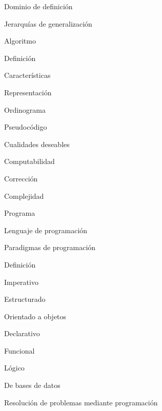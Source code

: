 \begin{longenum}
\begin{longenum}
\begin{longenum}
\begin{longenum}
                \item Dominio de definición
                \item Jerarquías de generalización
            \end{longenum}
            \item Algoritmo
            \begin{longenum}
                \item Definición
                \item Características
                \item Representación
                \begin{longenum}
                    \item Ordinograma
                    \item Pseudocódigo
                \end{longenum}
                \item Cualidades deseables
                \item Computabilidad
                \item Corrección
                \item Complejidad
            \end{longenum}
            \item Programa
            \item Lenguaje de programación
        \end{longenum}
        \item Paradigmas de programación
        \begin{longenum}
            \item Definición
            \item Imperativo
            \begin{longenum}
                \item Estructurado
                \item Orientado a objetos
            \end{longenum}
            \item Declarativo
            \begin{longenum}
                \item Funcional
                \item Lógico
                \item De bases de datos
            \end{longenum}
        \end{longenum}
        \item Resolución de problemas mediante programación

\end{longenum}
\end{longenum}
